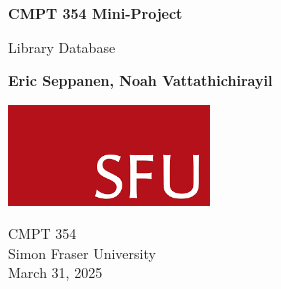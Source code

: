 \begin{titlepage}
   \begin{center}
       \vspace*{1cm}

       \textbf{CMPT 354 Mini-Project}

       \vspace{0.5cm}
       Library Database

       \vspace{1.5cm}

       \textbf{Eric Seppanen, Noah Vattathichirayil}

       \vfill

       \vspace{0.8cm}

       \includegraphics[width=0.4\textwidth]{SFU.png}

       CMPT 354\\
       Simon Fraser University\\
       March 31, 2025
   \end{center}
\end{titlepage}
